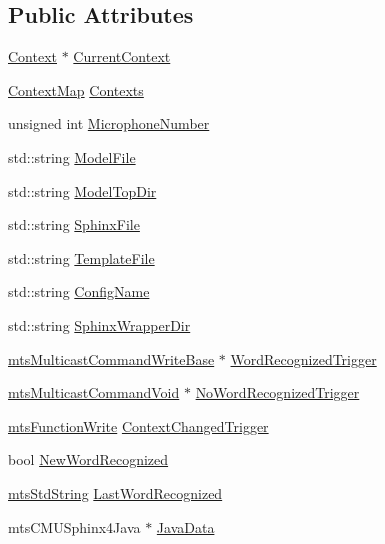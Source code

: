 \subsection*{Public Attributes}
\begin{DoxyCompactItemize}
\item 
\hyperlink{classmts_c_m_u_sphinx4_1_1_context}{Context} $\ast$ \hyperlink{classmts_c_m_u_sphinx4_af18513545284a63b71ebe36511d7a6b1}{Current\-Context}
\item 
\hyperlink{classmts_c_m_u_sphinx4_a5cf708712c99bce418627789835920d8}{Context\-Map} \hyperlink{classmts_c_m_u_sphinx4_a9ab5ad8754d6f798d08792ca5c7c0e14}{Contexts}
\item 
unsigned int \hyperlink{classmts_c_m_u_sphinx4_a3b59d452d70874fdb82e540347eca1e6}{Microphone\-Number}
\item 
std\-::string \hyperlink{classmts_c_m_u_sphinx4_a4722ad000506adea55df9f1167feae2a}{Model\-File}
\item 
std\-::string \hyperlink{classmts_c_m_u_sphinx4_a3d18ffea27a2019fe8f9deb44645b468}{Model\-Top\-Dir}
\item 
std\-::string \hyperlink{classmts_c_m_u_sphinx4_a7bd334f3fc83a2e02835b04c3aa97429}{Sphinx\-File}
\item 
std\-::string \hyperlink{classmts_c_m_u_sphinx4_af225e6118d17b5bd9d325a0876d7b2a2}{Template\-File}
\item 
std\-::string \hyperlink{classmts_c_m_u_sphinx4_ae28ac772c7e862fb2207c09cb4c39137}{Config\-Name}
\item 
std\-::string \hyperlink{classmts_c_m_u_sphinx4_a27347a99b66802545ec6c64aa85aebb3}{Sphinx\-Wrapper\-Dir}
\item 
\hyperlink{classmts_multicast_command_write_base}{mts\-Multicast\-Command\-Write\-Base} $\ast$ \hyperlink{classmts_c_m_u_sphinx4_a7a05ef0831adccfb72bebfcb22bbfd3b}{Word\-Recognized\-Trigger}
\item 
\hyperlink{classmts_multicast_command_void}{mts\-Multicast\-Command\-Void} $\ast$ \hyperlink{classmts_c_m_u_sphinx4_abb3de961c7753e3231b01b3edc593279}{No\-Word\-Recognized\-Trigger}
\item 
\hyperlink{classmts_function_write}{mts\-Function\-Write} \hyperlink{classmts_c_m_u_sphinx4_a117f1e3a1942cb21a1c54666f17c153f}{Context\-Changed\-Trigger}
\item 
bool \hyperlink{classmts_c_m_u_sphinx4_a80a401c501dc956347fb3e71716d3eb3}{New\-Word\-Recognized}
\item 
\hyperlink{mts_generic_object_proxy_8h_adbc21bfbf98367e582bf8a263b7e711f}{mts\-Std\-String} \hyperlink{classmts_c_m_u_sphinx4_a9ca792d5066dcae0a2edfc93c0c51480}{Last\-Word\-Recognized}
\item 
mts\-C\-M\-U\-Sphinx4\-Java $\ast$ \hyperlink{classmts_c_m_u_sphinx4_a16f510ea20ba70000841f1e8be81b0b9}{Java\-Data}
\end{DoxyCompactItemize}
